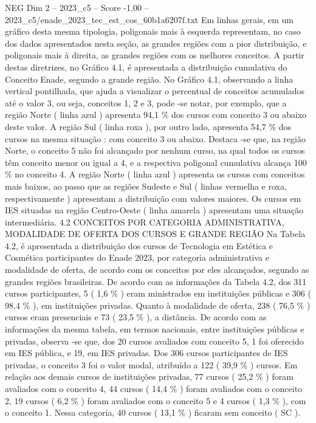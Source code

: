 \begin{textsample}{NEG Dim 2 – 2023\_c5 – Score -1.00 – 2023\_c5/enade\_2023\_tec\_est\_cos\_60b1a6207f.txt}
Em linhas gerais, em um gráfico desta mesma tipologia, poligonais mais à esquerda representam, no caso dos dados apresentados nesta seção, as grandes regiões com a pior distribuição, e poligonais mais à direita, as grandes regiões com os melhores conceitos.
A partir destas diretrizes, no Gráfico 4.1, é apresentada a distribuição cumulativa do Conceito Enade, segundo a grande região.
No Gráfico 4.1, observando a linha vertical pontilhada, que ajuda a visualizar o percentual de conceitos acumulados até o valor 3, ou seja, conceitos 1, 2 e 3, pode -se notar, por exemplo, que a região Norte ( linha azul ) apresenta 94,1 \% dos cursos com conceito 3 ou abaixo deste valor.
A região Sul ( linha roxa ), por outro lado, apresenta 54,7 \% dos cursos na mesma situação : com conceito 3 ou abaixo.
Destaca -se que, na região Norte, o conceito 5 não foi alcançado por nenhum curso, na qual todos os cursos têm conceito menor ou igual a 4, e a respectiva poligonal cumulativa alcança 100 \% no conceito 4.
A região Norte ( linha azul ) apresenta os cursos com conceitos mais baixos, ao passo que as regiões Sudeste e Sul ( linhas vermelha e roxa, respectivamente ) apresentam a distribuição com valores maiores.
Os cursos em IES situadas na região Centro-Oeste ( linha amarela ) apresentam uma situação intermediária. 4.2 CONCEITOS POR CATEGORIA ADMINISTRATIVA, MODALIDADE DE OFERTA DOS CURSOS E GRANDE REGIÃO Na Tabela 4.2, é apresentada a distribuição dos cursos de Tecnologia em Estética e Cosmética participantes do Enade 2023, por categoria administrativa e modalidade de oferta, de acordo com os conceitos por eles alcançados, segundo as grandes regiões brasileiras.
De acordo com as informações da Tabela 4.2, dos 311 cursos participantes, 5 ( 1,6 \% ) eram ministrados em instituições públicas e 306 ( 98,4 \% ), em instituições privadas.
Quanto à modalidade de oferta, 238 ( 76,5 \% ) cursos eram presenciais e 73 ( 23,5 \% ), a distância.
De acordo com as informações da mesma tabela, em termos nacionais, entre instituições públicas e privadas, observa -se que, dos 20 cursos avaliados com conceito 5, 1 foi oferecido em IES pública, e 19, em IES privadas.
Dos 306 cursos participantes de IES privadas, o conceito 3 foi o valor modal, atribuído a 122 ( 39,9 \% ) cursos.
Em relação aos demais cursos de instituições privadas, 77 cursos ( 25,2 \% ) foram avaliados com o conceito 4, 44 cursos ( 14,4 \% ) foram avaliados com o conceito 2, 19 cursos ( 6,2 \% ) foram avaliados com o conceito 5 e 4 cursos ( 1,3 \% ), com o conceito 1.
Nessa categoria, 40 cursos ( 13,1 \% ) ficaram sem conceito ( SC ).

\end{textsample}
